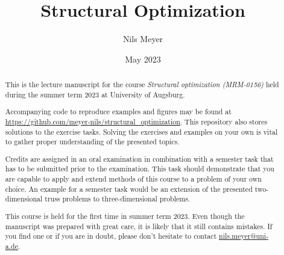 \documentclass[a4paper]{report}
\title{Structural Optimization}
\author{Nils Meyer}
\date{May 2023}
\begin{document}
\maketitle

\begin{abstract}
    This is the lecture manuscript for the course \emph{Structural optimization (MRM-0156)} held during the summer term 2023 at University of Augsburg. 

    Accompanying code to reproduce examples and figures may be found at \url{https://github.com/meyer-nils/structural_optimization}. This repository also stores solutions to the exercise tasks. Solving the exercises and examples on your own is vital to gather proper understanding of the presented topics. 

    Credits are assigned in an oral examination in combination with a semester task that has to be submitted prior to the examination. This task should demonstrate that you are capable to apply and extend methods of this course to a problem of your own choice. An example for a semester task would be an extension of the presented two-dimensional truss problems to three-dimensional problems. 

    This course is held for the first time in summer term 2023. Even though the manuscript was prepared with great care, it is likely that it still contains mistakes. If you find one or if you are in doubt, please don't hesitate to contact \href{mailto:nils.meyer@uni-a.de}{nils.meyer@uni-a.de}. 
\end{abstract}

\setcounter{tocdepth}{1}
\tableofcontents









\end{document}
